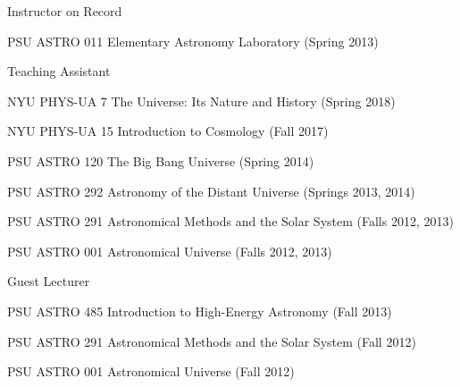\documentclass[11pt,letterpaper]{article}
\begin{document}
 \begin{list}{}{\malzlist}
 	\item Instructor on Record
 	  	\begin{list}{}{\malzlist}
             \item PSU ASTRO 011 Elementary Astronomy Laboratory (Spring 2013)
 		\end{list}
 	\item Teaching Assistant
           \begin{list}{}{\malzlist}
             \item NYU PHYS-UA 7 The Universe: Its Nature and History (Spring 2018)
             \item NYU PHYS-UA 15 Introduction to Cosmology (Fall 2017)
             \item PSU ASTRO 120 The Big Bang Universe (Spring 2014)
             \item PSU ASTRO 292 Astronomy of the Distant Universe (Springs 2013, 2014)
             \item PSU ASTRO 291 Astronomical Methods and the Solar System (Falls 2012, 2013)
             \item PSU ASTRO 001 Astronomical Universe (Falls 2012, 2013)
           \end{list}
     \item Guest Lecturer
           \begin{list}{}{\malzlist}
           \item PSU ASTRO 485 Introduction to High-Energy Astronomy (Fall 2013)%
           \item PSU ASTRO 291 Astronomical Methods and the Solar System (Fall 2012) %
           \item PSU ASTRO 001 Astronomical Universe (Fall 2012) %
           \end{list}
 \end{list}

\clearpage

%


\end{document}
